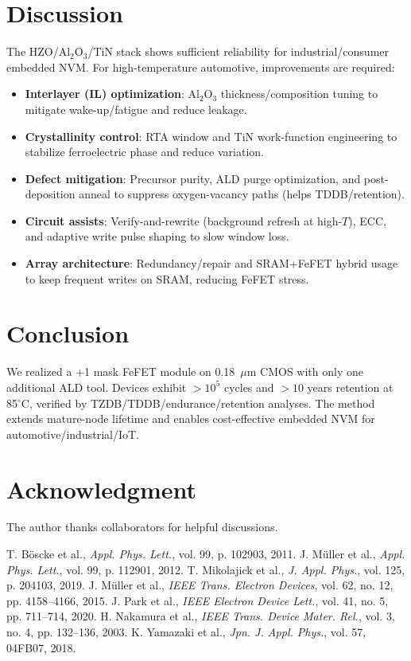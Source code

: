 \documentclass[conference]{IEEEtran}
\begin{document}
\section{Discussion}
The HZO/Al$_2$O$_3$/TiN stack shows sufficient reliability for industrial/consumer embedded NVM.
For high-temperature automotive, improvements are required:
\begin{itemize}
  \item \textbf{Interlayer (IL) optimization}: Al$_2$O$_3$ thickness/composition tuning to mitigate wake-up/fatigue and reduce leakage.
  \item \textbf{Crystallinity control}: RTA window and TiN work-function engineering to stabilize ferroelectric phase and reduce variation.
  \item \textbf{Defect mitigation}: Precursor purity, ALD purge optimization, and post-deposition anneal to suppress oxygen-vacancy paths (helps TDDB/retention).
  \item \textbf{Circuit assists}: Verify-and-rewrite (background refresh at high-$T$), ECC, and adaptive write pulse shaping to slow window loss.
  \item \textbf{Array architecture}: Redundancy/repair and SRAM+FeFET hybrid usage to keep frequent writes on SRAM, reducing FeFET stress.
\end{itemize}

\section{Conclusion}
We realized a +1 mask FeFET module on 0.18~$\mu$m CMOS with only one additional ALD tool.
Devices exhibit $>10^5$ cycles and $>10$ years retention at 85$^\circ$C, verified by TZDB/TDDB/endurance/retention analyses.
The method extends mature-node lifetime and enables cost-effective embedded NVM for automotive/industrial/IoT.

\section*{Acknowledgment}
The author thanks collaborators for helpful discussions.

\begin{thebibliography}{1}\setlength{\itemsep}{0pt plus 0.3pt}
 T. Böscke et al., \textit{Appl. Phys. Lett.}, vol. 99, p. 102903, 2011.
 J. Müller et al., \textit{Appl. Phys. Lett.}, vol. 99, p. 112901, 2012.
 T. Mikolajick et al., \textit{J. Appl. Phys.}, vol. 125, p. 204103, 2019.
 J. Müller et al., \textit{IEEE Trans. Electron Devices}, vol. 62, no. 12, pp. 4158--4166, 2015.
 J. Park et al., \textit{IEEE Electron Device Lett.}, vol. 41, no. 5, pp. 711--714, 2020.
 H. Nakamura et al., \textit{IEEE Trans. Device Mater. Rel.}, vol. 3, no. 4, pp. 132--136, 2003.
 K. Yamazaki et al., \textit{Jpn. J. Appl. Phys.}, vol. 57, 04FB07, 2018.
\end{thebibliography}
\end{document}

